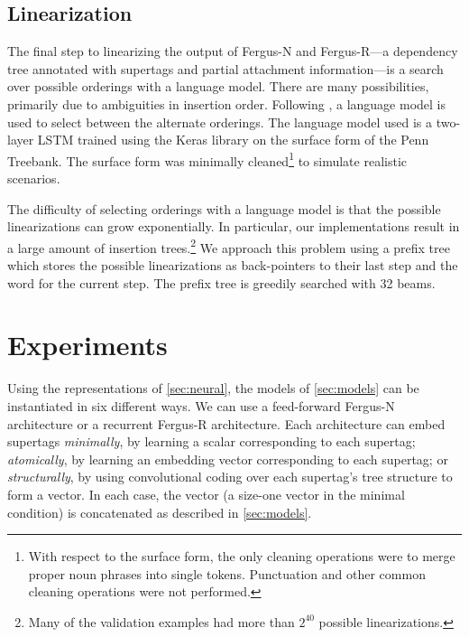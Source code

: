 \documentclass[11pt]{article}
\begin{document}
\subsection{Linearization}

The final step to linearizing the output of Fergus-N and Fergus-R---a dependency tree annotated with supertags and partial attachment information---is a search over possible orderings with a language model. 
%
There are many possibilities, primarily due to ambiguities in insertion
order.
%
Following , a language model is used to select between the alternate orderings. 
%
The language model used is a two-layer LSTM trained using the Keras library on
the surface form of the Penn Treebank.
%
The surface form was minimally cleaned\footnote{With respect to the surface form, the only
cleaning operations were to merge proper noun phrases into single tokens.  Punctuation and other
common cleaning operations were not performed.} to simulate realistic scenarios.

The difficulty of selecting orderings with a language model is that the possible linearizations can grow exponentially.
%
In particular, our implementations result in a large amount of insertion trees.\footnote{Many of the validation examples had more than $2^{40}$ possible linearizations.}
%
We approach this problem using a prefix tree which stores the possible linearizations as back-pointers to their last step and the word for the current step. 
%
The prefix tree is greedily searched with 32 beams.




\section{Experiments}
\label{sec:expt}

Using the representations of \ref{sec:neural}, the models of
\ref{sec:models} can be instantiated in six different ways.  We can
use a feed-forward Fergus-N architecture or a recurrent Fergus-R
architecture.  Each architecture can embed supertags \emph{minimally},
by learning a scalar corresponding to each supertag; \emph{atomically}, by learning an
embedding vector corresponding to each supertag; or
\emph{structurally}, by using convolutional coding over each
supertag's tree structure to form a vector.
%
In each case, the vector (a size-one vector in the minimal condition) is concatenated as described in \ref{sec:models}.
\end{document}
